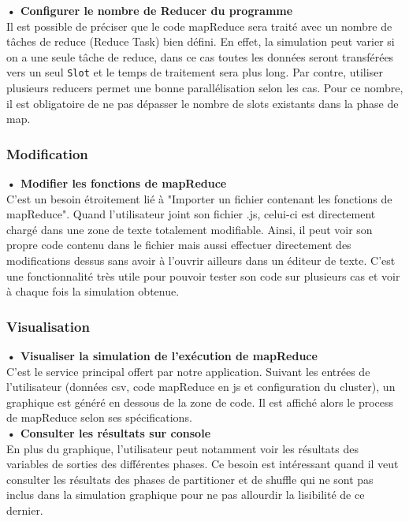 \textbf{• Configurer le nombre de Reducer du programme\\}  Il est possible de préciser que le code mapReduce sera traité avec un nombre de tâches de reduce (Reduce Task) bien défini. En effet, la simulation peut varier si on a une seule tâche de reduce, dans ce cas toutes les données seront transférées vers un seul {\tt Slot} et le temps de traitement sera plus long. Par contre, utiliser plusieurs reducers permet une bonne parallélisation selon les cas. Pour ce nombre, il est obligatoire de ne pas dépasser le nombre de slots existants dans la phase de map.  \\

\subsubsection{Modification} 

\textbf{• Modifier les fonctions de mapReduce\\} C'est un besoin étroitement lié à "Importer un fichier contenant les fonctions de mapReduce". Quand l'utilisateur joint son fichier .js, celui-ci est directement chargé dans une zone de texte totalement modifiable. Ainsi, il peut voir son propre code contenu dans le fichier mais aussi effectuer directement des modifications dessus sans avoir à l'ouvrir ailleurs dans un éditeur de texte. C'est une fonctionnalité très utile pour pouvoir tester son code sur plusieurs cas et voir à chaque fois la simulation obtenue.  \\

\subsubsection{Visualisation}

\textbf{•  Visualiser la simulation de l'exécution de mapReduce\\} C'est le service principal offert par notre application. Suivant les entrées de l'utilisateur (données csv, code mapReduce en js et configuration du cluster), un graphique est généré en dessous de la zone de code. Il est affiché alors le process de mapReduce selon ses spécifications.\\

\textbf{• Consulter les résultats sur console\\} En plus du graphique, l'utilisateur peut notamment voir les résultats des variables de sorties des différentes phases. Ce besoin est intéressant quand il veut consulter les résultats des phases de partitioner et de shuffle qui ne sont pas inclus dans la simulation graphique pour ne pas allourdir la lisibilité de ce dernier.\\


